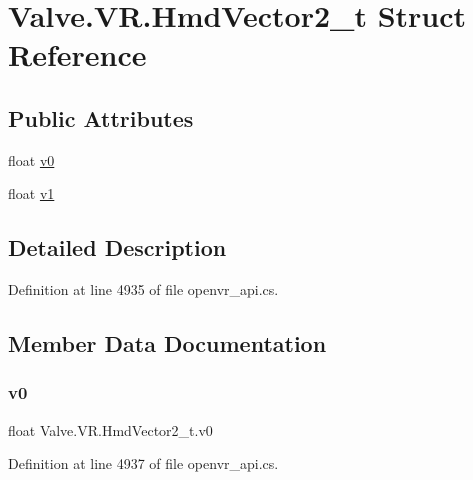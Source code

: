 \hypertarget{struct_valve_1_1_v_r_1_1_hmd_vector2__t}{}\section{Valve.\+V\+R.\+Hmd\+Vector2\+\_\+t Struct Reference}
\label{struct_valve_1_1_v_r_1_1_hmd_vector2__t}
\subsection*{Public Attributes}
\begin{DoxyCompactItemize}
\item 
float \mbox{\hyperlink{struct_valve_1_1_v_r_1_1_hmd_vector2__t_a619e168111e8a5ea80d7d4a2adc40cbd}{v0}}
\item 
float \mbox{\hyperlink{struct_valve_1_1_v_r_1_1_hmd_vector2__t_aa4d3d31baf4118cedd1d2edac4f65e3a}{v1}}
\end{DoxyCompactItemize}


\subsection{Detailed Description}


Definition at line 4935 of file openvr\+\_\+api.\+cs.



\subsection{Member Data Documentation}
\mbox{\label{struct_valve_1_1_v_r_1_1_hmd_vector2__t_a619e168111e8a5ea80d7d4a2adc40cbd}} 
\subsubsection{\texorpdfstring{v0}{v0}}
{\footnotesize\ttfamily float Valve.\+V\+R.\+Hmd\+Vector2\+\_\+t.\+v0}



Definition at line 4937 of file openvr\+\_\+api.\+cs.

\mbox{\label{struct_valve_1_1_v_r_1_1_hmd_vector2__t_aa4d3d31baf4118cedd1d2edac4f65e3a}} 
